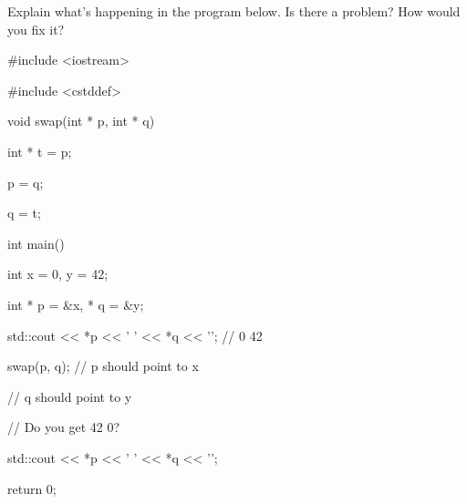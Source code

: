 Explain what's happening in the program below. Is there a problem? How would you fix it?



\begin{consolethree}[escapeinside=||]

#include <iostream>

#include <cstddef>



void swap(int * p, int * q)

{

    int * t = p;

    p = q;

    q = t;

}



int main()

{

    int x = 0, y = 42;

    int * p = &x, * q = &y;



    std::cout << *p << ' ' << *q << '\n'; // 0 42



    swap(p, q); // p should point to x



                // q should point to y



                // Do you get 42 0?



    std::cout << *p << ' ' << *q << '\n';

    return 0;

}

\end{consolethree}


